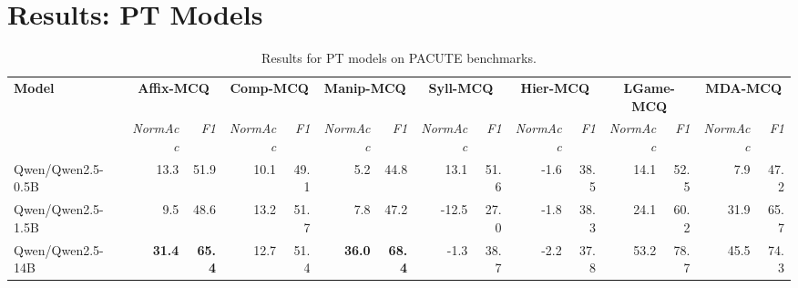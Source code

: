 \documentclass{article}
\begin{document}
\section*{Results: PT Models}

\begin{table}[htbp]
\centering
\caption{Results for PT models on PACUTE benchmarks.}
\label{tab:results-pt}
\begin{threeparttable}
\begin{adjustbox}{max width=\textwidth}
\begin{tabular}{lrrrrrrrrrrrrrr}
\toprule
\textbf{Model} & \multicolumn{2}{c}{\textbf{Affix-MCQ}} & \multicolumn{2}{c}{\textbf{Comp-MCQ}} & \multicolumn{2}{c}{\textbf{Manip-MCQ}} & \multicolumn{2}{c}{\textbf{Syll-MCQ}} & \multicolumn{2}{c}{\textbf{Hier-MCQ}} & \multicolumn{2}{c}{\textbf{LGame-MCQ}} & \multicolumn{2}{c}{\textbf{MDA-MCQ}} \\
\cmidrule(lr){2-3}\cmidrule(lr){4-5}\cmidrule(lr){6-7}\cmidrule(lr){8-9}\cmidrule(lr){10-11}\cmidrule(lr){12-13}\cmidrule(lr){14-15}
 & \textit{NormAcc} & \textit{F1} & \textit{NormAcc} & \textit{F1} & \textit{NormAcc} & \textit{F1} & \textit{NormAcc} & \textit{F1} & \textit{NormAcc} & \textit{F1} & \textit{NormAcc} & \textit{F1} & \textit{NormAcc} & \textit{F1} \\
\midrule
Qwen/Qwen2.5-0.5B & \cellcolor[HTML]{FEFCFB}13.3 & \cellcolor[HTML]{F7FAFC}51.9 & \cellcolor[HTML]{E5F1F7}10.1 & \cellcolor[HTML]{E1EFF6}49.1 & \cellcolor[HTML]{F9D3C2}5.2 & \cellcolor[HTML]{FADBCD}44.8 & \cellcolor[HTML]{F3F8FB}13.1 & \cellcolor[HTML]{E5F1F7}51.6 & \cellcolor[HTML]{FCE9E0}-1.6 & \cellcolor[HTML]{FCEAE3}38.5 & \cellcolor[HTML]{F6B99E}14.1 & \cellcolor[HTML]{F7C1AA}52.5 & \cellcolor[HTML]{F7C2AA}7.9 & \cellcolor[HTML]{F9CEBB}47.2 \\
Qwen/Qwen2.5-1.5B & \cellcolor[HTML]{FCE9E0}9.5 & \cellcolor[HTML]{FDF1EC}48.6 & \cellcolor[HTML]{B7D8E9}13.2 & \cellcolor[HTML]{B4D7E8}51.7 & \cellcolor[HTML]{FBDED2}7.8 & \cellcolor[HTML]{FCE8DF}47.2 & \cellcolor[HTML]{F4A582}-12.5 & \cellcolor[HTML]{F4A582}27.0 & \cellcolor[HTML]{FBE3D8}-1.8 & \cellcolor[HTML]{FBE4DA}38.3 & \cellcolor[HTML]{F9CEBB}24.1 & \cellcolor[HTML]{FADCCF}60.2 & \cellcolor[HTML]{FDF5F1}31.9 & \cellcolor[HTML]{F3F8FB}65.7 \\
Qwen/Qwen2.5-14B & \cellcolor[HTML]{92C5DE}\textbf{31.4} & \cellcolor[HTML]{92C5DE}\textbf{65.4} & \cellcolor[HTML]{BEDCEB}12.7 & \cellcolor[HTML]{BBDAEA}51.4 & \cellcolor[HTML]{92C5DE}\textbf{36.0} & \cellcolor[HTML]{92C5DE}\textbf{68.4} & \cellcolor[HTML]{F9D0BE}-1.3 & \cellcolor[HTML]{FAD9CB}38.7 & \cellcolor[HTML]{FAD6C6}-2.2 & \cellcolor[HTML]{FAD8C8}37.8 & \cellcolor[HTML]{EFF6FA}53.2 & \cellcolor[HTML]{DAEBF3}78.7 & \cellcolor[HTML]{E7F2F7}45.5 & \cellcolor[HTML]{D2E7F1}74.3 \\

\end{tabular}
\end{adjustbox}
\end{threeparttable}
\end{table}
\end{document}
